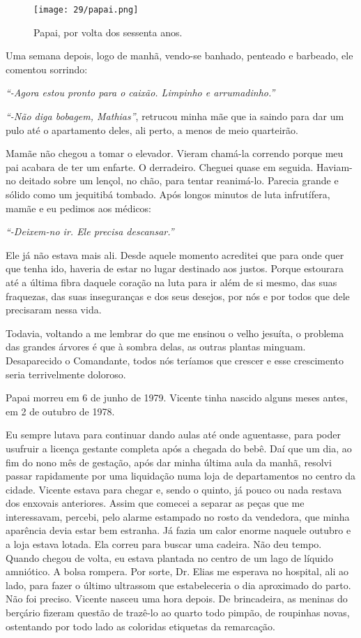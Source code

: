 \begin{figure}
\centering
\texttt{[image: 29/papai.png]}
\caption{Papai, por volta dos sessenta anos.}
\end{figure}

Uma semana depois, logo de manhã, vendo-se banhado, penteado e barbeado, ele comentou sorrindo:

\textit{``-Agora estou pronto para o caixão.
Limpinho e arrumadinho.''}

\textit{``-Não diga bobagem, Mathias''}, retrucou minha mãe que ia saindo para dar um pulo até o apartamento deles, ali perto, a menos de meio quarteirão.

Mamãe não chegou a tomar o elevador.
Vieram chamá-la correndo porque meu pai acabara de ter um enfarte.
O derradeiro.
Cheguei quase em seguida.
Haviam-no deitado sobre um lençol, no chão, para tentar reanimá-lo.
Parecia grande e sólido como um jequitibá tombado.
Após longos minutos de luta infrutífera, mamãe e eu pedimos aos médicos: 

\textit{``-Deixem-no ir.
Ele precisa descansar.''}

Ele já não estava mais ali.
Desde aquele momento acreditei que para onde quer que tenha ido, haveria de estar no lugar destinado aos justos.
Porque estourara até a última fibra daquele coração na luta para ir além de si mesmo, das suas fraquezas, das suas inseguranças e dos seus desejos, por nós e por todos que dele precisaram nessa vida.

Todavia, voltando a me lembrar do que me ensinou o velho jesuíta, o problema das grandes árvores é que à sombra delas, as outras plantas minguam.
Desaparecido o Comandante, todos nós teríamos que crescer e esse crescimento seria terrivelmente doloroso.

Papai morreu em 6 de junho de 1979.
Vicente tinha nascido alguns meses antes, em 2 de outubro de 1978.

Eu sempre lutava para continuar dando aulas até onde aguentasse, para poder usufruir a licença gestante completa após a chegada do bebê.
Daí que um dia, ao fim do nono mês de gestação, após dar minha última aula da manhã, resolvi passar rapidamente por uma liquidação numa loja de departamentos no centro da cidade.
Vicente estava para chegar e, sendo o quinto, já pouco ou nada restava dos enxovais anteriores.
Assim que comecei a separar as peças que me interessavam, percebi, pelo alarme estampado no rosto da vendedora, que minha aparência devia estar bem estranha.
Já fazia um calor enorme naquele outubro e a loja estava lotada.
Ela correu para buscar uma cadeira.
Não deu tempo.
Quando chegou de volta, eu estava plantada no centro de um lago de líquido amniótico.
A bolsa rompera.
Por sorte, Dr. Elias me esperava no hospital, ali ao lado, para fazer o último ultrassom que estabeleceria o dia aproximado do parto.
Não foi preciso.
Vicente nasceu uma hora depois.
De brincadeira, as meninas do berçário fizeram questão de trazê-lo ao quarto todo pimpão, de roupinhas novas, ostentando por todo lado as coloridas etiquetas da remarcação.


